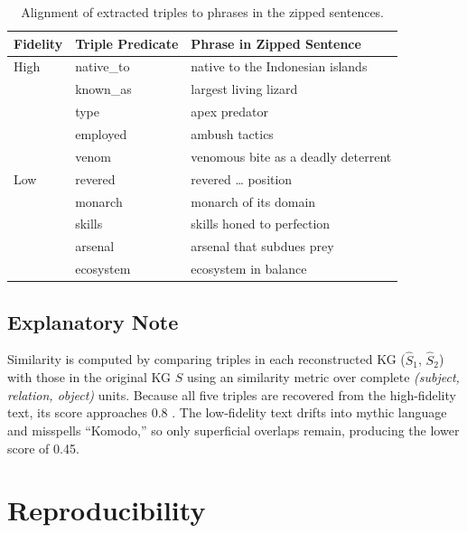 \documentclass[11pt]{article}
\begin{document}
\begin{table}[htbp!]
  \centering
  \caption{Alignment of extracted triples to phrases in the zipped sentences.}
  \label{tab:tri2zip}
  \begin{tabular}{@{}lp{6.2cm}p{6.2cm}@{}}
    \toprule
    \textbf{Fidelity} & \textbf{Triple Predicate} & \textbf{Phrase in Zipped Sentence} \\
    \midrule
    High & native\_to   & native to the Indonesian islands \\
         & known\_as    & largest living lizard \\
         & type         & apex predator \\
         & employed     & ambush tactics \\
         & venom        & venomous bite as a deadly deterrent \\
    \addlinespace[3pt]
    Low  & revered      & revered \dots{} position \\
         & monarch      & monarch of its domain \\
         & skills       & skills honed to perfection \\
         & arsenal      & arsenal that subdues prey \\
         & ecosystem    & ecosystem in balance \\
    \bottomrule
  \end{tabular}
\end{table}

\subsection{Explanatory Note}

Similarity is computed by comparing triples in each reconstructed KG
($\hat S_1$, $\hat S_2$) with those in the original KG $S$ using an
similarity metric over complete \emph{(subject, relation, object)} units.
Because all five triples are recovered from the high-fidelity text, its
score approaches 0.8 .  
The low-fidelity text drifts into mythic language and misspells
“Komodo,” so only superficial overlaps remain, producing the lower score
of 0.45.


\section{Reproducibility}
\label{appendix:reproducibility}
\end{document}
